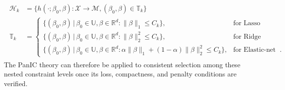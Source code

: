 \documentclass[12pt]{article}
\theoremstyle{remark}
\theoremstyle{plain}
\begin{document}
\begin{align}\label{Eqs: Model selection}
\begin{split}
    \mathcal{H}_k &= \{h(\cdot; \beta_0, \beta): \mathcal{X} \to \mathcal{M}, (\beta_0, \beta) \in \mathbb{T}_k\}\\
    \mathbb{T}_k &= \begin{cases}
        \{(\beta_0, \beta) \, |\, \beta_0 \in \mathbb{U}, \beta\in \mathbb{R}^d: \lVert\beta\rVert_1 \leq C_k\}, & \text{for Lasso regression,}\\
        \{(\beta_0, \beta) \, |\, \beta_0 \in \mathbb{U}, \beta\in \mathbb{R}^d: \lVert\beta\rVert_2^2 \leq C_k\}, & \text{for Ridge regression,}\\
        \{(\beta_0, \beta) \, |\, \beta_0 \in \mathbb{U}, \beta\in \mathbb{R}^d: \alpha\lVert\beta\rVert_1 + (1-\alpha)\lVert\beta\rVert_2^2 \leq C_k\}, & \text{for Elastic-net regression}.
    \end{cases}
\end{split}
\end{align}
The PanIC theory can therefore be applied to consistent selection among these nested constraint levels once its loss, compactness, and penalty conditions are verified.
\end{document}
